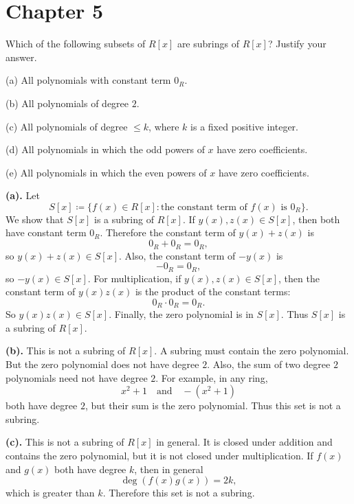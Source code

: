 
\section{Chapter 5}

\begin{problem}{
    Which of the following subsets of $R[x]$ are subrings of $R[x]$?
    Justify your answer.

    (a) All polynomials with constant term $0_R$.

    (b) All polynomials of degree $2$.

    (c) All polynomials of degree $\leq k$, where $k$ is a fixed positive integer.

    (d) All polynomials in which the odd powers of $x$ have zero coefficients.

    (e) All polynomials in which the even powers of $x$ have zero coefficients.
}
    \textbf{(a).}
    Let
    \[
        S[x]\coloneqq \{f(x)\in R[x] : \text{the constant term of } f(x)\text{ is }0_R\}.
    \]
    We show that $S[x]$ is a subring of $R[x]$.
    If $y(x),z(x)\in S[x]$, then both have constant term $0_R$.
    Therefore the constant term of $y(x)+z(x)$ is
    \[
        0_R+0_R=0_R,
    \]
    so $y(x)+z(x)\in S[x]$.
    Also, the constant term of $-y(x)$ is
    \[
        -0_R=0_R,
    \]
    so $-y(x)\in S[x]$.
    For multiplication, if $y(x),z(x)\in S[x]$, then the constant term of $y(x)z(x)$ is the product of the constant terms:
    \[
        0_R\cdot 0_R=0_R.
    \]
    So $y(x)z(x)\in S[x]$.
    Finally, the zero polynomial is in $S[x]$.
    Thus $S[x]$ is a subring of $R[x]$.

    \textbf{(b).}
    This is not a subring of $R[x]$.
    A subring must contain the zero polynomial.
    But the zero polynomial does not have degree $2$.
    Also, the sum of two degree $2$ polynomials need not have degree $2$.
    For example, in any ring,
    \[
        x^2+1
        \quad\text{and}\quad
        -(x^2+1)
    \]
    both have degree $2$, but their sum is the zero polynomial.
    Thus this set is not a subring.

    \textbf{(c).}
    This is not a subring of $R[x]$ in general.
    It is closed under addition and contains the zero polynomial, but it is not closed under multiplication.
    If $f(x)$ and $g(x)$ both have degree $k$, then in general
    \[
        \deg(f(x)g(x))=2k,
    \]
    which is greater than $k$.
    Therefore this set is not a subring.


\end{problem}
